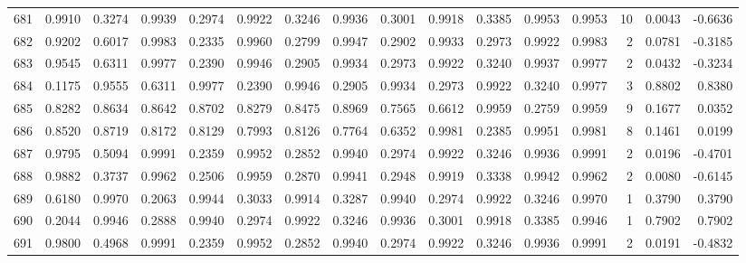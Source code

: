 \begin{tabular}{lrrrrrrrrrrrrrrr}
681 &      0.9910 &  0.3274 &  0.9939 &  0.2974 &  0.9922 &  0.3246 &  0.9936 &  0.3001 &  0.9918 &  0.3385 &   0.9953 &     0.9953 &     10 &                    0.0043 &                    -0.6636 \\
682 &      0.9202 &  0.6017 &  0.9983 &  0.2335 &  0.9960 &  0.2799 &  0.9947 &  0.2902 &  0.9933 &  0.2973 &   0.9922 &     0.9983 &      2 &                    0.0781 &                    -0.3185 \\
683 &      0.9545 &  0.6311 &  0.9977 &  0.2390 &  0.9946 &  0.2905 &  0.9934 &  0.2973 &  0.9922 &  0.3240 &   0.9937 &     0.9977 &      2 &                    0.0432 &                    -0.3234 \\
684 &      0.1175 &  0.9555 &  0.6311 &  0.9977 &  0.2390 &  0.9946 &  0.2905 &  0.9934 &  0.2973 &  0.9922 &   0.3240 &     0.9977 &      3 &                    0.8802 &                     0.8380 \\
685 &      0.8282 &  0.8634 &  0.8642 &  0.8702 &  0.8279 &  0.8475 &  0.8969 &  0.7565 &  0.6612 &  0.9959 &   0.2759 &     0.9959 &      9 &                    0.1677 &                     0.0352 \\
686 &      0.8520 &  0.8719 &  0.8172 &  0.8129 &  0.7993 &  0.8126 &  0.7764 &  0.6352 &  0.9981 &  0.2385 &   0.9951 &     0.9981 &      8 &                    0.1461 &                     0.0199 \\
687 &      0.9795 &  0.5094 &  0.9991 &  0.2359 &  0.9952 &  0.2852 &  0.9940 &  0.2974 &  0.9922 &  0.3246 &   0.9936 &     0.9991 &      2 &                    0.0196 &                    -0.4701 \\
688 &      0.9882 &  0.3737 &  0.9962 &  0.2506 &  0.9959 &  0.2870 &  0.9941 &  0.2948 &  0.9919 &  0.3338 &   0.9942 &     0.9962 &      2 &                    0.0080 &                    -0.6145 \\
689 &      0.6180 &  0.9970 &  0.2063 &  0.9944 &  0.3033 &  0.9914 &  0.3287 &  0.9940 &  0.2974 &  0.9922 &   0.3246 &     0.9970 &      1 &                    0.3790 &                     0.3790 \\
690 &      0.2044 &  0.9946 &  0.2888 &  0.9940 &  0.2974 &  0.9922 &  0.3246 &  0.9936 &  0.3001 &  0.9918 &   0.3385 &     0.9946 &      1 &                    0.7902 &                     0.7902 \\
691 &      0.9800 &  0.4968 &  0.9991 &  0.2359 &  0.9952 &  0.2852 &  0.9940 &  0.2974 &  0.9922 &  0.3246 &   0.9936 &     0.9991 &      2 &                    0.0191 &                    -0.4832 \\

\end{tabular}
